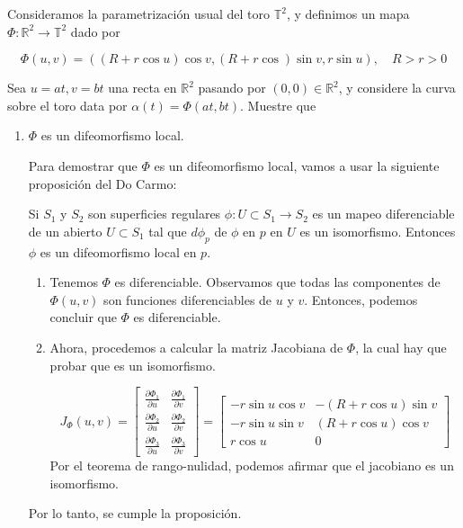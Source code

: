 \begin{problema}
    Consideramos la parametrización usual del toro $\mathbb{T}^{2}$, y definimos un mapa $\Phi: \mathbb{R}^{2} \rightarrow \mathbb{T}^{2}$ dado por

$$
\Phi(u, v)=((R+r \cos u) \cos v,(R+r \cos ) \sin v, r \sin u), \quad R>r>0
$$

Sea $u=a t, v=b t$ una recta en $\mathbb{R}^{2}$ pasando por $(0,0) \in \mathbb{R}^{2}$, y considere la curva sobre el toro data por $\alpha(t)=\Phi(a t, b t)$. Muestre que

\begin{enumerate}
    \item $\Phi$ es un difeomorfismo local.
    \begin{sol}
        Para demostrar que $\Phi$ es un difeomorfismo local, vamos  a usar la siguiente proposición del Do Carmo:
        \begin{cajita}
            Si $S_1$ y $S_2$ son superficies regulares $\phi:U\subset S_1\to S_2$ es un mapeo diferenciable de un abierto $U\subset S_1$ tal que $d\phi_p$ de $\phi$ en $p$ en $U$ es un isomorfismo. Entonces $\phi$ es un difeomorfismo local en $p$. 
        \end{cajita}

        \begin{enumerate}
            \item Tenemos $\Phi$ es diferenciable. Observamos que todas las componentes de $\Phi(u, v)$ son funciones diferenciables de $u$ y $v$. Entonces, podemos concluir que $\Phi$ es diferenciable. 
            \item Ahora, procedemos a calcular la matriz Jacobiana de $\Phi$, la cual hay que probar que es un isomorfismo. 
        
            $$
            J_\Phi(u, v) =
            \begin{bmatrix}
            \frac{\partial\Phi_1}{\partial u} & \frac{\partial\Phi_1}{\partial v} \\
            \frac{\partial\Phi_2}{\partial u} & \frac{\partial\Phi_2}{\partial v} \\
            \frac{\partial\Phi_3}{\partial u} & \frac{\partial\Phi_3}{\partial v}
            \end{bmatrix}
            =
            \begin{bmatrix}
            -r\sin{u}\cos{v} & -(R+r\cos{u})\sin{v} \\
            -r\sin{u}\sin{v} & (R+r\cos{u})\cos{v} \\
            r\cos{u} & 0
            \end{bmatrix}
            $$
            Por el teorema de rango-nulidad, podemos afirmar que el jacobiano es un isomorfismo. 
            \end{enumerate}
            Por lo tanto, se cumple la proposición. 
        

\end{sol}
\end{enumerate}
\end{problema}
